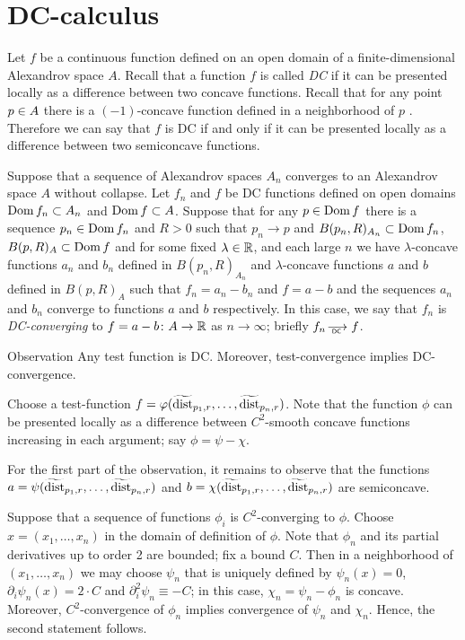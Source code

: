  
 

  
 
\section{DC-calculus}\label{sec:DC}

Let $f$ be a continuous function defined on an open domain of a finite-dimensional Alexandrov space $A$.
Recall that a function $f$ is called \emph{DC} if it can be presented locally as a difference between two concave functions.
Recall that for any point $p\zz\in A$ there is a $(-1)$-concave function defined in a  neighborhood  of $p$ \cite[3.6]{PerMorse}.
Therefore we can say that $f$ is DC if and only if it can be presented locally as a difference between two semiconcave functions. 

Suppose that a sequence of Alexandrov spaces $A_n$ converges to an Alexandrov space $A$ without collapse.
Let $f_n$ and $f$ be DC functions defined on open domains $\mathop{\rm Dom} f_n\subset A_n$ and $\mathop{\rm Dom} f \subset A$.
Suppose that for any $p\in \mathop{\rm Dom} f$ there is a sequence $p_n\in \mathop{\rm Dom} f_n$ and $R>0$ such that $p_n\to p$ and $B(p_n,R)_{A_n}\subset \mathop{\rm Dom} f_n$, $B(p,R)_{A}\subset\mathop{\rm Dom} f$
and for some fixed $\lambda\in\mathbb{R}$, and each large $n$ we have $\lambda$-concave functions $a_n$ and $b_n$ defined in $B(p_n,R)_{A_n}$ and $\lambda$-concave functions $a$ and $b$ defined in $B(p,R)_{A}$
such that $f_n=a_n-b_n$ and $f=a-b$ and the sequences
$a_n$ and $b_n$ converge to functions $a$ and $b$ respectively.
In this case, we say that $f_n$ is \emph{DC-converging} to $f=a-b\colon A\to \mathbb{R}$ as $n\to\infty$; briefly $f_n\DCto f$.

\begin{thm}{Observation}\label{obs:test-DC}
Any test function is DC. Moreover, test-convergence implies DC-convergence. 
\end{thm}

Choose a test-function $f=\varphi(\widetilde{\operatorname{\rm dist}}_{p_1,r},\dots,\widetilde{\operatorname{\rm dist}}_{p_n,r})$.
Note that the function $\phi$ can be presented locally as a difference between $C^2$-smooth concave functions increasing in each argument; say $\phi=\psi-\chi$.

For the first part of the observation, it remains to observe that the functions $a=\psi(\widetilde{\operatorname{\rm dist}}_{p_1,r},\dots,\widetilde{\operatorname{\rm dist}}_{p_n,r})$ and $b=\chi(\widetilde{\operatorname{\rm dist}}_{p_1,r},\dots,\widetilde{\operatorname{\rm dist}}_{p_n,r})$ are semiconcave.

Suppose that a sequence of functions $\phi_i$ is $C^2$-converging to $\phi$.
Choose $x=(x_1,\dots,x_n)$ in the domain of definition of $\phi$.
Note that $\phi_n$ and its partial derivatives up to order 2 are bounded;
fix a bound $C$.
Then in a neighborhood of $(x_1,\dots,x_n)$ we may choose $\psi_n$ that is uniquely defined by $\psi_n(x)=0$, $\partial_i\psi_n(x)=2\cdot C$ and $\partial_i^2\psi_n\equiv -C$; in this case, $\chi_n=\psi_n-\phi_n$ is concave.
Moreover, $C^2$-convergence of $\phi_n$ implies convergence of $\psi_n$ and $\chi_n$.
Hence, the second statement follows.
\qeds

